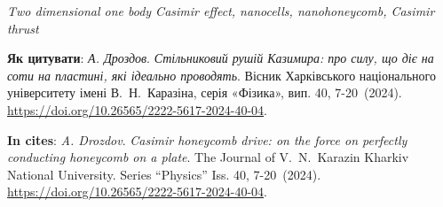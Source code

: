 \documentclass[twoside, 10pt]{article}
\def\myfirstpage{7}
\def\mylastpage{20}
\def\mypages{\myfirstpage-\mylastpage}
\def\myname{A. Drozdov}
\def\mynameukr{А. Дроздов}
\def\mytitle{Casimir honeycomb drive: on the force on perfectly conducting honeycomb on a plate}
\def\mytitleukr{Стільниковий рушій Казимира: про силу, що діє на соти на пластині, які ідеально проводять}
\def\mydoi{10.26565/2222-5617-2024-40-04}
\def\ukrvisnyk{Вісник Харківського національного університету імені В.~Н.~Каразіна, серія «Фізика», вип. 40, \mypages~(2024)}
\def\envisnyk{The Journal of V.~N.~Karazin Kharkiv National University. Series “Physics” Iss. 40, \mypages~(2024)}
\begin{document}

\vspace{5mm}

\noindent
\begin{keywords}
\textit{Two dimensional one body Casimir effect, nanocells, nanohoneycomb, Casimir thrust}
\end{keywords}

\vspace{5mm}

\selectfont

\noindent
\textbf{Як цитувати}: \textit{\mynameukr}. \textit{\mytitleukr}. {\ukrvisnyk}. \href{https://doi.org/\mydoi}{https://doi.org/\mydoi}.

\vspace{5mm}

\selectfont

\noindent
\textbf{In cites}: \textit{\myname}. \textit{\mytitle}. {\envisnyk}. \href{https://doi.org/\mydoi}{https://doi.org/\mydoi}.

\vspace{5mm}

\newpage
\end{document}
